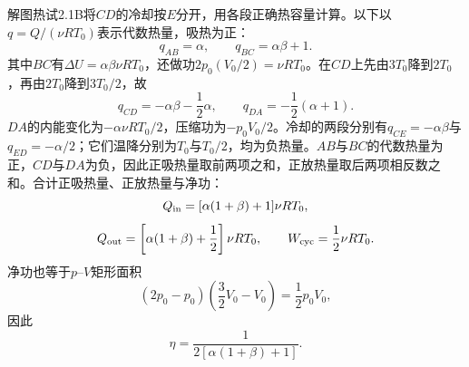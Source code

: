 \documentclass[UTF8,fontset=fandol,a4paper,11pt]{ctexart}
\begin{document}
解图热试2.1B将$CD$的冷却按$E$分开，用各段正确热容量计算。以下以$q=Q/(\nu RT_0)$表示代数热量，吸热为正：
\[
q_{AB}=\alpha,\qquad
q_{BC}=\alpha\beta+1.
\]
其中$BC$有$\Delta U=\alpha\beta\nu RT_0$，还做功$2p_0(V_0/2)=\nu RT_0$。在$CD$上先由$3T_0$降到$2T_0$，再由$2T_0$降到$3T_0/2$，故
\[
q_{CD}=-\alpha\beta-\frac12\alpha,
\qquad
q_{DA}=-\frac12(\alpha+1).
\]
$DA$的内能变化为$-\alpha\nu RT_0/2$，压缩功为$-p_0V_0/2$。冷却的两段分别有$q_{CE}=-\alpha\beta$与$q_{ED}=-\alpha/2$；它们温降分别为$T_0$与$T_0/2$，均为负热量。$AB$与$BC$的代数热量为正，$CD$与$DA$为负，因此正吸热量取前两项之和，正放热量取后两项相反数之和。合计正吸热量、正放热量与净功：
\[
Q_{\rm in}=[\alpha(1+\beta)+1]\nu RT_0,
\]
\[
Q_{\rm out}=\left[\alpha(1+\beta)+\frac12\right]\nu RT_0,
\qquad
W_{\rm cyc}=\frac12\nu RT_0.
\]
净功也等于$p$--$V$矩形面积
\[
(2p_0-p_0)\left(\frac32V_0-V_0\right)
=\frac12p_0V_0,
\]
因此
\[
\boxed{\eta=\frac1{2[\alpha(1+\beta)+1]}}.
\]
\end{document}
